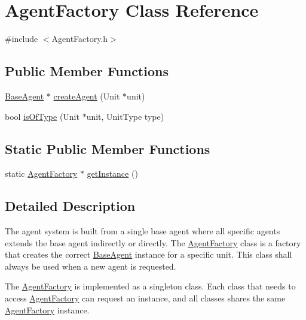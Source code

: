 \hypertarget{class_agent_factory}{\section{Agent\-Factory Class Reference}
\label{class_agent_factory}
}


{\ttfamily \#include $<$Agent\-Factory.\-h$>$}

\subsection*{Public Member Functions}
\begin{DoxyCompactItemize}
\item 
\hyperlink{class_base_agent}{Base\-Agent} $\ast$ \hyperlink{class_agent_factory_a2fbdcc02dc4c539a072b1796b76a2dcf}{create\-Agent} (Unit $\ast$unit)
\item 
bool \hyperlink{class_agent_factory_a2b580aee6965ac454284077872ce36a9}{is\-Of\-Type} (Unit $\ast$unit, Unit\-Type type)
\end{DoxyCompactItemize}
\subsection*{Static Public Member Functions}
\begin{DoxyCompactItemize}
\item 
static \hyperlink{class_agent_factory}{Agent\-Factory} $\ast$ \hyperlink{class_agent_factory_a4fb0ddfd94d0462eb0c369f8376f82a7}{get\-Instance} ()
\end{DoxyCompactItemize}


\subsection{Detailed Description}
The agent system is built from a single base agent where all specific agents extends the base agent indirectly or directly. The \hyperlink{class_agent_factory}{Agent\-Factory} class is a factory that creates the correct \hyperlink{class_base_agent}{Base\-Agent} instance for a specific unit. This class shall always be used when a new agent is requested.

The \hyperlink{class_agent_factory}{Agent\-Factory} is implemented as a singleton class. Each class that needs to access \hyperlink{class_agent_factory}{Agent\-Factory} can request an instance, and all classes shares the same \hyperlink{class_agent_factory}{Agent\-Factory} instance.

